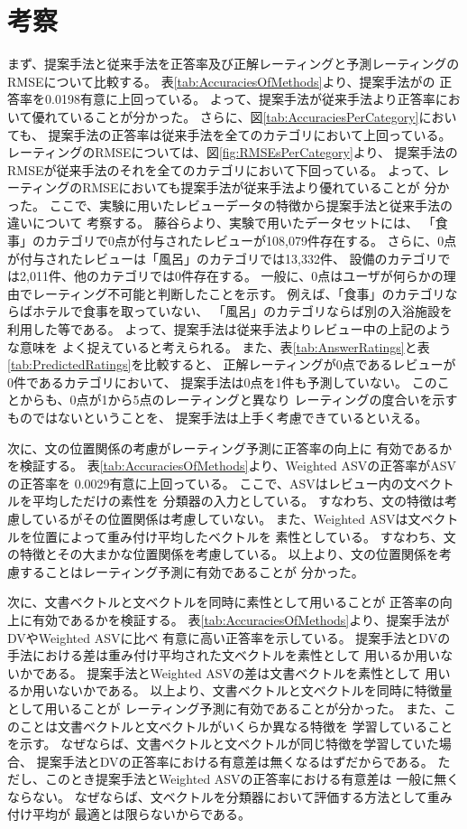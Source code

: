 \section{考察} \label{sec:Discussion}

まず、提案手法と従来手法を正答率及び正解レーティングと予測レーティングの
RMSEについて比較する。
表\ref{tab:AccuraciesOfMethods}より、提案手法が\rival の
正答率を0.0198有意に上回っている。
よって、提案手法が従来手法より正答率において優れていることが分かった。
さらに、図\ref{tab:AccuraciesPerCategory}においても、
提案手法の正答率は従来手法を全てのカテゴリにおいて上回っている。
レーティングのRMSEについては、図\ref{fig:RMSEsPerCategory}より、
提案手法のRMSEが従来手法のそれを全てのカテゴリにおいて下回っている。
よって、レーティングのRMSEにおいても提案手法が従来手法より優れていることが
分かった。
ここで、実験に用いたレビューデータの特徴から提案手法と従来手法の違いについて
考察する。
藤谷ら\cite{fujitani15}より、実験で用いたデータセットには、
「食事」のカテゴリで0点が付与されたレビューが108,079件存在する。
さらに、0点が付与されたレビューは「風呂」のカテゴリでは13,332件、
設備のカテゴリでは2,011件、他のカテゴリでは0件存在する。
一般に、0点はユーザが何らかの理由でレーティング不可能と判断したことを示す。
例えば、「食事」のカテゴリならばホテルで食事を取っていない、
「風呂」のカテゴリならば別の入浴施設を利用した等である。
よって、提案手法は従来手法よりレビュー中の上記のような意味を
よく捉えていると考えられる。
また、表\ref{tab:AnswerRatings}と表\ref{tab:PredictedRatings}を比較すると、
正解レーティングが0点であるレビューが0件であるカテゴリにおいて、
提案手法は0点を1件も予測していない。
このことからも、0点が1から5点のレーティングと異なり
レーティングの度合いを示すものではないということを、
提案手法は上手く考慮できているといえる。

次に、文の位置関係の考慮がレーティング予測に正答率の向上に
有効であるかを検証する。
表\ref{tab:AccuraciesOfMethods}より、Weighted ASVの正答率がASVの正答率を
0.0029有意に上回っている。
ここで、ASVはレビュー内の文ベクトルを平均しただけの素性を
分類器の入力としている。
すなわち、文の特徴は考慮しているがその位置関係は考慮していない。
また、Weighted ASVは文ベクトルを位置によって重み付け平均したベクトルを
素性としている。
すなわち、文の特徴とその大まかな位置関係を考慮している。
以上より、文の位置関係を考慮することはレーティング予測に有効であることが
分かった。

次に、文書ベクトルと文ベクトルを同時に素性として用いることが
正答率の向上に有効であるかを検証する。
表\ref{tab:AccuraciesOfMethods}より、提案手法がDVやWeighted ASVに比べ
有意に高い正答率を示している。
提案手法とDVの手法における差は重み付け平均された文ベクトルを素性として
用いるか用いないかである。
提案手法とWeighted ASVの差は文書ベクトルを素性として
用いるか用いないかである。
以上より、文書ベクトルと文ベクトルを同時に特徴量として用いることが
レーティング予測に有効であることが分かった。
また、このことは文書ベクトルと文ベクトルがいくらか異なる特徴を
学習していることを示す。
なぜならば、文書ベクトルと文ベクトルが同じ特徴を学習していた場合、
提案手法とDVの正答率における有意差は無くなるはずだからである。
ただし、このとき提案手法とWeighted ASVの正答率における有意差は
一般に無くならない。
なぜならば、文ベクトルを分類器において評価する方法として重み付け平均が
最適とは限らないからである。

